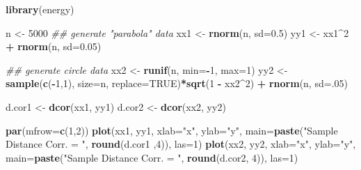 \documentclass[]{book}
\newenvironment{Shaded}{\begin{snugshade}}{\end{snugshade}}
\newcommand{\CommentTok}[1]{\textcolor[rgb]{0.56,0.35,0.01}{\textit{#1}}}
\newcommand{\DataTypeTok}[1]{\textcolor[rgb]{0.13,0.29,0.53}{#1}}
\newcommand{\DecValTok}[1]{\textcolor[rgb]{0.00,0.00,0.81}{#1}}
\newcommand{\FloatTok}[1]{\textcolor[rgb]{0.00,0.00,0.81}{#1}}
\newcommand{\KeywordTok}[1]{\textcolor[rgb]{0.13,0.29,0.53}{\textbf{#1}}}
\newcommand{\NormalTok}[1]{#1}
\newcommand{\OperatorTok}[1]{\textcolor[rgb]{0.81,0.36,0.00}{\textbf{#1}}}
\newcommand{\OtherTok}[1]{\textcolor[rgb]{0.56,0.35,0.01}{#1}}
\newcommand{\StringTok}[1]{\textcolor[rgb]{0.31,0.60,0.02}{#1}}
\begin{document}
\begin{Shaded}
\begin{Highlighting}[]
\KeywordTok{library}\NormalTok{(energy)}

\NormalTok{n <-}\StringTok{ }\DecValTok{5000}
\CommentTok{## generate "parabola" data}
\NormalTok{xx1 <-}\StringTok{ }\KeywordTok{rnorm}\NormalTok{(n, }\DataTypeTok{sd=}\FloatTok{0.5}\NormalTok{)  }
\NormalTok{yy1 <-}\StringTok{ }\NormalTok{xx1}\OperatorTok{^}\DecValTok{2} \OperatorTok{+}\StringTok{ }\KeywordTok{rnorm}\NormalTok{(n, }\DataTypeTok{sd=}\FloatTok{0.05}\NormalTok{)}

\CommentTok{## generate circle data}
\NormalTok{xx2 <-}\StringTok{ }\KeywordTok{runif}\NormalTok{(n, }\DataTypeTok{min=}\OperatorTok{-}\DecValTok{1}\NormalTok{, }\DataTypeTok{max=}\DecValTok{1}\NormalTok{)}
\NormalTok{yy2 <-}\StringTok{ }\KeywordTok{sample}\NormalTok{(}\KeywordTok{c}\NormalTok{(}\OperatorTok{-}\DecValTok{1}\NormalTok{,}\DecValTok{1}\NormalTok{), }\DataTypeTok{size=}\NormalTok{n, }\DataTypeTok{replace=}\OtherTok{TRUE}\NormalTok{)}\OperatorTok{*}\KeywordTok{sqrt}\NormalTok{(}\DecValTok{1} \OperatorTok{-}\StringTok{ }\NormalTok{xx2}\OperatorTok{^}\DecValTok{2}\NormalTok{) }\OperatorTok{+}\StringTok{ }\KeywordTok{rnorm}\NormalTok{(n, }\DataTypeTok{sd=}\NormalTok{.}\DecValTok{05}\NormalTok{)}

\NormalTok{d.cor1 <-}\StringTok{ }\KeywordTok{dcor}\NormalTok{(xx1, yy1)}
\NormalTok{d.cor2 <-}\StringTok{ }\KeywordTok{dcor}\NormalTok{(xx2, yy2)}

\KeywordTok{par}\NormalTok{(}\DataTypeTok{mfrow=}\KeywordTok{c}\NormalTok{(}\DecValTok{1}\NormalTok{,}\DecValTok{2}\NormalTok{))}
\KeywordTok{plot}\NormalTok{(xx1, yy1, }\DataTypeTok{xlab=}\StringTok{"x"}\NormalTok{, }\DataTypeTok{ylab=}\StringTok{"y"}\NormalTok{, }\DataTypeTok{main=}\KeywordTok{paste}\NormalTok{(}\StringTok{"Sample Distance Corr. = "}\NormalTok{, }
                                              \KeywordTok{round}\NormalTok{(d.cor1 ,}\DecValTok{4}\NormalTok{)), }\DataTypeTok{las=}\DecValTok{1}\NormalTok{)}
\KeywordTok{plot}\NormalTok{(xx2, yy2, }\DataTypeTok{xlab=}\StringTok{"x"}\NormalTok{, }\DataTypeTok{ylab=}\StringTok{"y"}\NormalTok{, }\DataTypeTok{main=}\KeywordTok{paste}\NormalTok{(}\StringTok{"Sample Distance Corr. = "}\NormalTok{, }
                                              \KeywordTok{round}\NormalTok{(d.cor2, }\DecValTok{4}\NormalTok{)), }\DataTypeTok{las=}\DecValTok{1}\NormalTok{)}
\end{Highlighting}
\end{Shaded}
\end{document}

